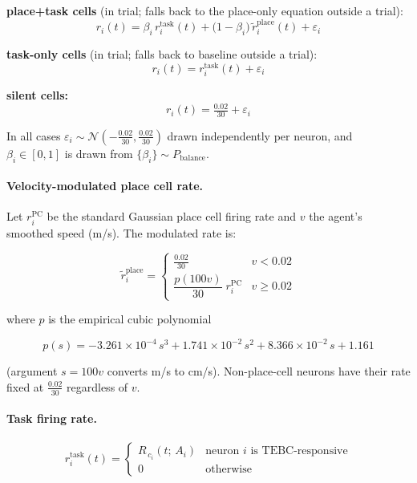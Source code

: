 \documentclass{article}
\begin{document}
\noindent
\textbf{place+task cells} (in trial; falls back to the place-only equation outside a trial):
\begin{equation}
    r_i(t) = \beta_i\, r^{\mathrm{task}}_i(t)
           + \bigl(1 - \beta_i\bigr)\, \tilde{r}^{\mathrm{place}}_i(t)
           + \varepsilon_i
\end{equation}

\noindent
\textbf{task-only cells} (in trial; falls back to baseline outside a trial):
\begin{equation}
    r_i(t) = r^{\mathrm{task}}_i(t) + \varepsilon_i
\end{equation}

\noindent
\textbf{silent cells:}
\begin{equation}
    r_i(t) = \tfrac{0.02}{30} + \varepsilon_i
\end{equation}

\noindent
In all cases $\varepsilon_i \sim \mathcal{N}\!\left(-\tfrac{0.02}{30}, \tfrac{0.02}{30}\right)$
drawn independently per neuron, and $\beta_i \in [0, 1]$ is drawn from
$\{\beta_i\} \sim P_{\mathrm{balance}}$.

\paragraph{Velocity-modulated place cell rate.}
Let $r^{\mathrm{PC}}_i$ be the standard Gaussian place cell firing rate and $v$ the
agent's smoothed speed (m/s). The modulated rate is:

\begin{equation}
    \tilde{r}^{\mathrm{place}}_i =
    \begin{cases}
        \tfrac{0.02}{30} & v < 0.02 \\[4pt]
        \dfrac{p(100v)}{30}\; r^{\mathrm{PC}}_i & v \geq 0.02
    \end{cases}
\end{equation}

\noindent
where $p$ is the empirical cubic polynomial

\begin{equation}
    p(s) = -3.261 \times 10^{-4}\, s^3
          + 1.741 \times 10^{-2}\, s^2
          + 8.366 \times 10^{-2}\, s
          + 1.161
\end{equation}

\noindent
(argument $s = 100v$ converts m/s to cm/s).
Non-place-cell neurons have their rate fixed at $\tfrac{0.02}{30}$ regardless of $v$.

\paragraph{Task firing rate.}
\begin{equation}
    r^{\mathrm{task}}_i(t) =
    \begin{cases}
        R_{\,c_i}(t;\, A_i) & \text{neuron } i \text{ is TEBC-responsive} \\
        0            & \text{otherwise}
    \end{cases}
\end{equation}
\end{document}
